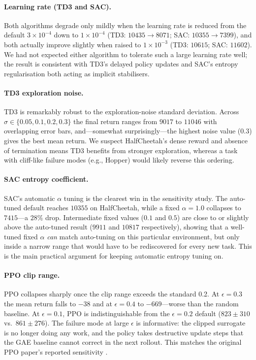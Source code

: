 \documentclass[letterpaper]{article}
\begin{document}
\paragraph{Learning rate (TD3 and SAC).}
Both algorithms degrade only mildly when the learning rate is reduced
from the default $3\!\times\!10^{-4}$ down to $1\!\times\!10^{-4}$ (TD3:
$10435 \rightarrow 8071$; SAC: $10355 \rightarrow 7399$), and both
actually improve slightly when raised to $1\!\times\!10^{-3}$ (TD3:
$10615$; SAC: $11602$). We had not expected either algorithm to tolerate
such a large learning rate well; the result is consistent with TD3's
delayed policy updates and SAC's entropy regularisation both acting as
implicit stabilisers.

\paragraph{TD3 exploration noise.}
TD3 is remarkably robust to the exploration-noise standard deviation.
Across $\sigma \in \{0.05, 0.1, 0.2, 0.3\}$ the final return ranges from
$9017$ to $11046$ with overlapping error bars, and---somewhat surprisingly---the
highest noise value ($0.3$) gives the best mean return. We suspect
HalfCheetah's dense reward and absence of termination means TD3 benefits
from stronger exploration, whereas a task with cliff-like failure modes
(e.g., Hopper) would likely reverse this ordering.

\paragraph{SAC entropy coefficient.}
SAC's automatic $\alpha$ tuning is the clearest win in the sensitivity
study. The auto-tuned default reaches $10355$ on HalfCheetah, while a
fixed $\alpha = 1.0$ collapses to $7415$---a $28\%$ drop. Intermediate
fixed values ($0.1$ and $0.5$) are close to or slightly above the
auto-tuned result ($9911$ and $10817$ respectively), showing that a
well-tuned fixed $\alpha$ \emph{can} match auto-tuning on this particular
environment, but only inside a narrow range that would have to be
rediscovered for every new task. This is the main practical argument for
keeping automatic entropy tuning on.

\paragraph{PPO clip range.}
PPO collapses sharply once the clip range exceeds the standard 0.2. At
$\epsilon=0.3$ the mean return falls to $-38$ and at $\epsilon=0.4$ to
$-669$---worse than the random baseline. At $\epsilon=0.1$, PPO is
indistinguishable from the $\epsilon=0.2$ default ($823 \pm 310$ vs.\
$861 \pm 276$). The failure mode at large $\epsilon$ is informative: the
clipped surrogate is no longer doing any work, and the policy takes
destructive update steps that the GAE baseline cannot correct in the next
rollout. This matches the original PPO paper's reported sensitivity
\citep{schulman2017ppo}.
\end{document}
